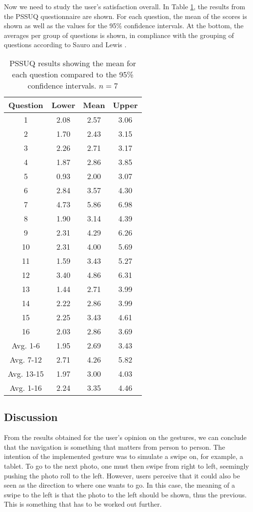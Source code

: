 \documentclass[11pt,a4paper]{article}
\begin{document}
Now we need to study the user's satisfaction overall. In Table \ref{tab:pssuq}, the results from the PSSUQ questionnaire are shown. For each question, the mean of the scores is shown as well as the values for the 95\% confidence intervals. At the bottom, the averages per group of questions is shown, in compliance with the grouping of questions according to Sauro and Lewis \cite{sauro2012quantifying}.

\begin{table}[t!]
\begin{center}
\begin{tabular}{c || c || c | c}
\textbf{Question} &
\textbf{Lower} &
\textbf{Mean} &
\textbf{Upper} \\
\hline
1 & 2.08 & 2.57 & 3.06 \\
2 & 1.70 & 2.43 & 3.15 \\
3 & 2.26 & 2.71 & 3.17\\
4 & 1.87 & 2.86 & 3.85 \\
5 & 0.93 & 2.00 & 3.07 \\
6 & 2.84 & 3.57 & 4.30 \\
7 & 4.73 & 5.86 & 6.98\\
8 & 1.90 & 3.14 & 4.39\\
9  & 2.31 & 4.29 & 6.26\\
10 & 2.31 & 4.00 & 5.69\\
11 & 1.59 & 3.43 & 5.27\\
12 & 3.40 & 4.86 & 6.31\\
13 & 1.44 & 2.71 & 3.99\\
14 & 2.22 & 2.86 & 3.99\\
15 & 2.25 & 3.43 & 4.61\\
16 & 2.03 & 2.86 & 3.69 \\
\hline 
\hline
Avg. 1-6 & 1.95 & 2.69 & 3.43 \\
Avg. 7-12 & 2.71 & 4.26 & 5.82 \\
Avg. 13-15  & 1.97 & 3.00  & 4.03 \\
Avg. 1-16  & 2.24 & 3.35 &  4.46 \\
\end{tabular} 
\caption{PSSUQ results showing the mean for each question compared to the 95\% confidence intervals. $n=7$}
\label{tab:pssuq}
\end{center}
\end{table}

\pagebreak

\subsection{Discussion}
From the results obtained for the user's opinion on the gestures, we can conclude that the navigation is something that matters from person to person. The intention of the implemented gesture was to simulate a swipe on, for example, a tablet. To go to the next photo, one must then swipe from right to left, seemingly pushing the photo roll to the left. However, users perceive that it could also be seen as the direction to where one wants to go. In this case, the meaning of a swipe to the left is that the photo to the left should be shown, thus the previous. This is something that has to be worked out further. 
\end{document}
